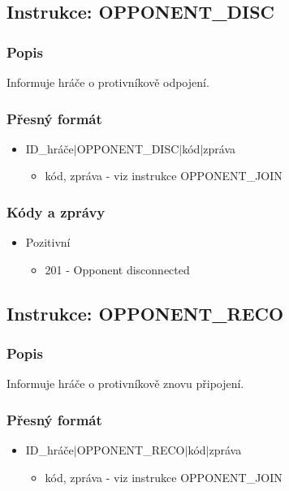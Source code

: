 \documentclass[12pt]{report}
\begin{document}
\subsection{Instrukce: OPPONENT\_DISC}
\subsubsection{Popis}
Informuje hráče o protivníkově odpojení.

\subsubsection{Přesný formát}
\begin{itemize}
	\item ID\_hráče$|$OPPONENT\_DISC$|$kód$|$zpráva
		\begin{itemize}
				\item kód, zpráva - viz instrukce OPPONENT\_JOIN
		\end{itemize}
\end{itemize}

\subsubsection{Kódy a zprávy}
\begin{itemize}
	\item Pozitivní
		\begin{itemize}
			\item 201 - Opponent disconnected
		\end{itemize}
\end{itemize}
%
%
%
\subsection{Instrukce: OPPONENT\_RECO}
\subsubsection{Popis}
Informuje hráče o protivníkově znovu připojení.

\subsubsection{Přesný formát}
\begin{itemize}
	\item ID\_hráče$|$OPPONENT\_RECO$|$kód$|$zpráva
		\begin{itemize}
				\item kód, zpráva - viz instrukce OPPONENT\_JOIN
		\end{itemize}
\end{itemize}
\end{document}
